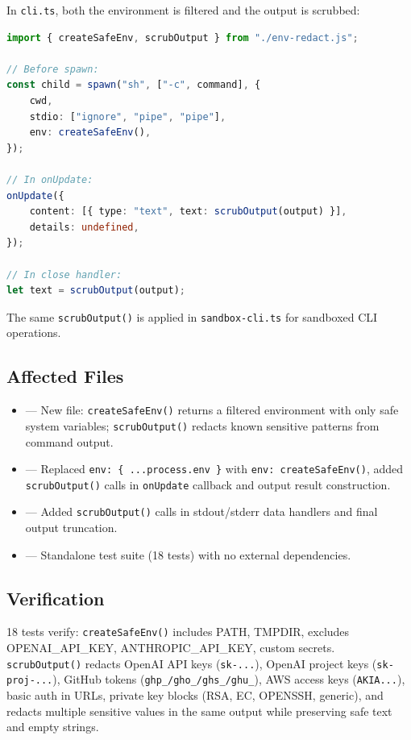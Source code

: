 In \texttt{cli.ts}, both the environment is filtered and the output is scrubbed:

\begin{lstlisting}[language=TypeScript]
import { createSafeEnv, scrubOutput } from "./env-redact.js";

// Before spawn:
const child = spawn("sh", ["-c", command], {
    cwd,
    stdio: ["ignore", "pipe", "pipe"],
    env: createSafeEnv(),
});

// In onUpdate:
onUpdate({
    content: [{ type: "text", text: scrubOutput(output) }],
    details: undefined,
});

// In close handler:
let text = scrubOutput(output);
\end{lstlisting}

The same \texttt{scrubOutput()} is applied in \texttt{sandbox-cli.ts} for sandboxed CLI operations.

\subsection*{Affected Files}
\begin{itemize}
    \item {} --- New file: \texttt{createSafeEnv()} returns a filtered environment with only safe system variables; \texttt{scrubOutput()} redacts known sensitive patterns from command output.
    \item {} --- Replaced \texttt{env: \{ ...process.env \}} with \texttt{env: createSafeEnv()}, added \texttt{scrubOutput()} calls in \texttt{onUpdate} callback and output result construction.
    \item {} --- Added \texttt{scrubOutput()} calls in stdout/stderr data handlers and final output truncation.
    \item {} --- Standalone test suite (18 tests) with no external dependencies.
\end{itemize}

\subsection*{Verification}
18 tests verify: \texttt{createSafeEnv()} includes PATH, TMPDIR, excludes OPENAI\_API\_KEY, ANTHROPIC\_API\_KEY, custom secrets. \texttt{scrubOutput()} redacts OpenAI API keys (\texttt{sk-...}), OpenAI project keys (\texttt{sk-proj-...}), GitHub tokens (\texttt{ghp\_/gho\_/ghs\_/ghu\_}), AWS access keys (\texttt{AKIA...}), basic auth in URLs, private key blocks (RSA, EC, OPENSSH, generic), and redacts multiple sensitive values in the same output while preserving safe text and empty strings.
